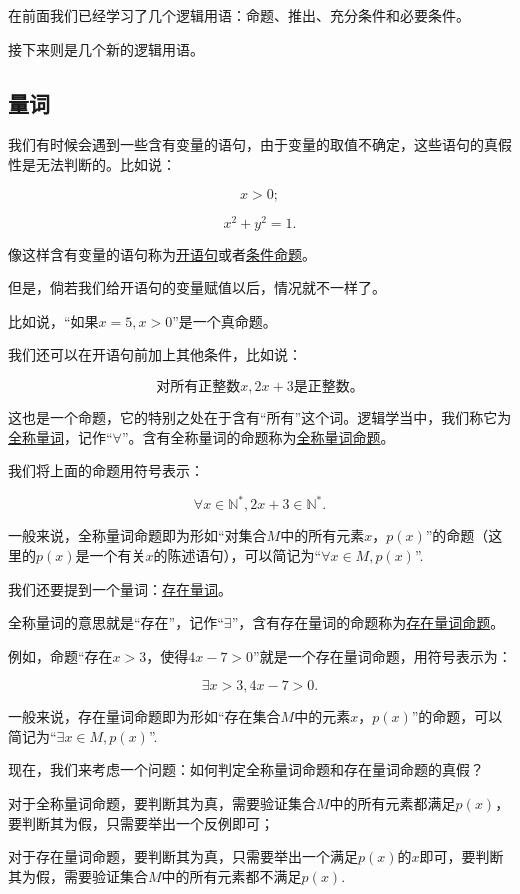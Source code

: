 \documentclass[lang=cn,math=cm,chinesefont=nofont,11pt,scheme=chinese,twocol]{elegantbook}
\begin{document}
在前面我们已经学习了几个逻辑用语：命题、推出、充分条件和必要条件。

接下来则是几个新的逻辑用语。

\subsection{量词}

我们有时候会遇到一些含有变量的语句，由于变量的取值不确定，这些语句的真假性是无法判断的。比如说：

$$x>0;$$

$$x^2+y^2=1.$$

像这样含有变量的语句称为\underline{开语句}或者\underline{条件命题}。

但是，倘若我们给开语句的变量赋值以后，情况就不一样了。

比如说，“如果$x=5,x>0$”是一个真命题。

我们还可以在开语句前加上其他条件，比如说：

$$\text{对所有正整数}x,2x+3\text{是正整数。}$$

这也是一个命题，它的特别之处在于含有“所有”这个词。逻辑学当中，我们称它为\underline{全称量词}，记作“$\forall$”。含有全称量词的命题称为\underline{全称量词命题}。

我们将上面的命题用符号表示：

$$\forall x\in\mathbb{N}^*,2x+3\in\mathbb{N}^*.$$

一般来说，全称量词命题即为形如“对集合$M$中的所有元素$x$，$p(x)$”的命题（这里的$p(x)$是一个有关$x$的陈述语句），可以简记为“$\forall x\in M,p(x)$”.

\hspace*{\fill}

我们还要提到一个量词：\underline{存在量词}。

全称量词的意思就是“存在”，记作“$\exists$”，含有存在量词的命题称为\underline{存在量词命题}。

例如，命题“存在$x>3$，使得$4x-7>0$”就是一个存在量词命题，用符号表示为：

$$\exists x>3,4x-7>0.$$

一般来说，存在量词命题即为形如“存在集合$M$中的元素$x$，$p(x)$”的命题，可以简记为“$\exists x\in M,p(x)$”.

现在，我们来考虑一个问题：如何判定全称量词命题和存在量词命题的真假？

对于全称量词命题，要判断其为真，需要验证集合$M$中的所有元素都满足$p(x)$，要判断其为假，只需要举出一个反例即可；

对于存在量词命题，要判断其为真，只需要举出一个满足$p(x)$的$x$即可，要判断其为假，需要验证集合$M$中的所有元素都不满足$p(x)$.
\end{document}
